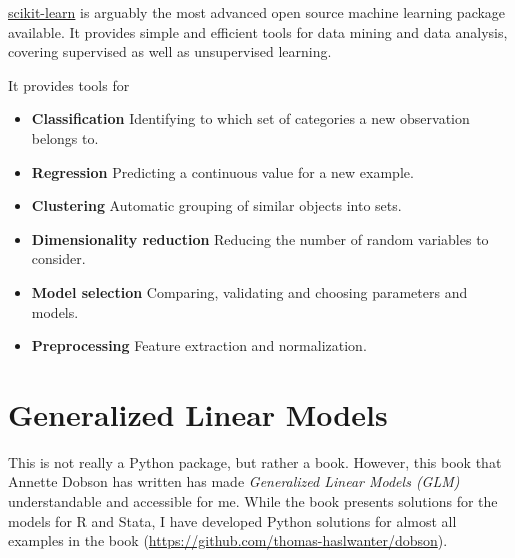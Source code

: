 \href{scikit-learn.org}{scikit-learn} is arguably the most advanced open source machine learning package available. It provides simple and efficient tools for data mining and data analysis, covering supervised as well as unsupervised learning.

It provides tools for

\begin{itemize}
  \item \textbf{Classification}    Identifying to which set of categories a new observation belongs to.
  \item \textbf{Regression}    Predicting a continuous value for a new example.
  \item \textbf{Clustering}    Automatic grouping of similar objects into sets.
  \item \textbf{Dimensionality reduction}    Reducing the number of random variables to consider.
  \item \textbf{Model selection}    Comparing, validating and choosing parameters and models.
  \item \textbf{Preprocessing}    Feature extraction and normalization.
\end{itemize}

\section{Generalized Linear Models}

This is not really a Python package, but rather a book. However, this book that Annette Dobson has written has made \emph{Generalized Linear Models (GLM)} \cite{Dobson2008} understandable and accessible for me. While the book presents solutions for the models for R and Stata, I have developed Python solutions for almost all examples in the book (\url{https://github.com/thomas-haslwanter/dobson}). 